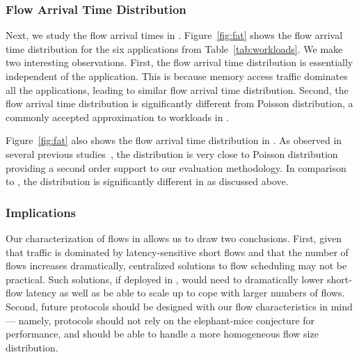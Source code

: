 \subsubsection{Flow Arrival Time Distribution}
\label{ssec:fatd}
Next, we study the flow arrival times in \dis. Figure~\ref{fig:fat} shows the flow arrival time distribution for the six applications from Table~\ref{tab:workloads}. We make two interesting observations. First, the flow arrival time distribution is essentially independent of the application. This is because memory access traffic dominates all the applications, leading to similar flow arrival time distribution. Second, the flow arrival time distribution is significantly different from Poisson distribution, a commonly accepted approximation to workloads in \pdis. 

Figure~\ref{fig:fat} also shows the flow arrival time distribution in \pdis. As observed in several previous studies~\cite{srikanth, theo}, the distribution is very close to Poisson distribution providing a second order support to our evaluation methodology. In comparison to \pdis, the distribution is significantly different in \dis as discussed above.

\subsubsection{Implications}
Our characterization of flows in \dis allows us to draw two conclusions. First, given that \dis traffic is dominated by latency-sensitive short flows and that the number of flows increases dramatically, centralized solutions to flow scheduling may not be practical. Such solutions, if deployed in \dis, would need to dramatically lower short-flow latency as well as be able to scale up to cope with larger numbers of flows. Second, future protocols should be designed with our flow characteristics in mind --- namely, protocols should not rely on the elephant-mice conjecture for performance, and should be able to handle a more homogeneous flow size distribution. 


